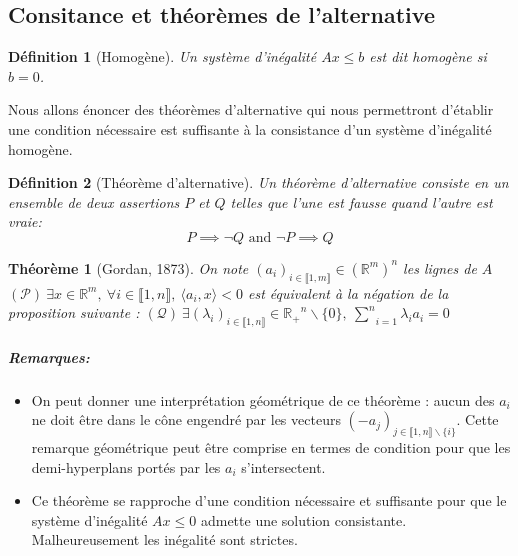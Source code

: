 \documentclass[10pt,a4paper]{article}
\newtheorem{thm}{Théorème}
\newtheorem{mydef}{Définition}
\begin{document}
\subsection{Consitance et théorèmes de l'alternative}
\begin{mydef}[Homogène]
  Un système d'inégalité $Ax \leq b$ est dit homogène si $b=0$.
\end{mydef}

Nous allons énoncer des théorèmes d'alternative qui nous permettront d'établir une condition nécessaire est suffisante à la consistance d'un système d'inégalité homogène.

\begin{mydef}[Théorème d'alternative]
  Un théorème d'alternative consiste en un ensemble de deux assertions $P$ et $Q$ telles que l'une est fausse quand l'autre est vraie:
\[ P \implies \neg Q \text{ and } \neg P \implies Q \]
\end{mydef}


\begin{thm}[Gordan, 1873]
  On note $(a_i)_{i \in \llbracket 1,m \rrbracket} \in \left(\mathbb{R}^m \right)^n$ les lignes de $A$
  $(\mathcal{P}) \  \exists x \in \mathbb{R}^m, \ \forall i \in \llbracket 1,n \rrbracket, \ \langle a_i,x \rangle <0$ est équivalent à la négation de la proposition suivante : $ (\mathcal{Q}) \ \exists (\lambda_i)_{i \in \llbracket 1,n \rrbracket}\in \mathbb{R_+}^n \backslash\lbrace 0\rbrace, \ \underset{i=1}{\overset{n}{\sum}} \lambda_i a_i=0$
\end{thm}
\subparagraph{Remarques:}
\begin{itemize}
  \item
    On peut donner une interprétation géométrique de ce théorème : aucun des $a_i$ ne doit être dans le cône engendré par les vecteurs $(-a_j)_{j \in \llbracket 1,n \rrbracket \backslash \lbrace i \rbrace}$.
    Cette remarque géométrique peut être comprise en termes de condition pour que les demi-hyperplans portés par les $a_i$ s'intersectent.
  \item
    Ce théorème se rapproche d'une condition nécessaire et suffisante pour que le système d'inégalité $Ax \leq 0$ admette une solution consistante.
    Malheureusement les inégalité sont strictes.
\end{itemize}
\end{document}
